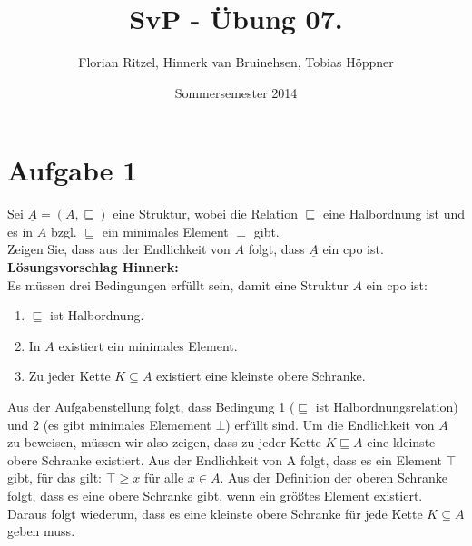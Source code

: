 \documentclass[ngerman,a4paper]{report}
\author{Florian Ritzel, Hinnerk van Bruinehsen, Tobias Höppner}
\title{SvP - Übung 07. }
\date{Sommersemester 2014}
\renewcommand{\maketitle}{}
\begin{document}
\maketitle
\section*{Aufgabe 1}
Sei $\underline{A} = (A,\sqsubseteq)$ eine Struktur, wobei die Relation $\sqsubseteq$ eine Halbordnung ist und es in $A$ bzgl. $\sqsubseteq$ ein minimales Element $\perp$ gibt.\\
Zeigen Sie, dass aus der Endlichkeit von $A$ folgt, dass $\underline{A}$ ein cpo ist.\\

\textbf{Lösungsvorschlag Hinnerk:}\\
Es müssen drei Bedingungen erfüllt sein, damit eine Struktur $A$ ein cpo ist:
\begin{enumerate}
\item $\sqsubseteq$ ist Halbordnung.
\item In $A$ existiert ein minimales Element.
\item Zu jeder Kette $K\subseteq A$ existiert eine kleinste obere Schranke.
\end{enumerate}
Aus der Aufgabenstellung folgt, dass Bedingung 1 ($\sqsubseteq$ ist Halbordnungsrelation) und 2 (es gibt minimales Elemement $\bot$) erfüllt sind.
Um die Endlichkeit von $A$ zu beweisen, müssen wir also zeigen, dass zu jeder Kette $K\sqsubseteq A$ eine kleinste obere Schranke existiert.
Aus der Endlichkeit von A folgt, dass es ein Element $\top$ gibt, für das gilt: $\top \geq x$ für alle $x \in A$. Aus der Definition der oberen Schranke folgt, dass es eine obere Schranke gibt, wenn ein größtes Element existiert. Daraus folgt wiederum, dass es eine kleinste obere Schranke für jede Kette $K\subseteq A$ geben muss.
\end{document}
